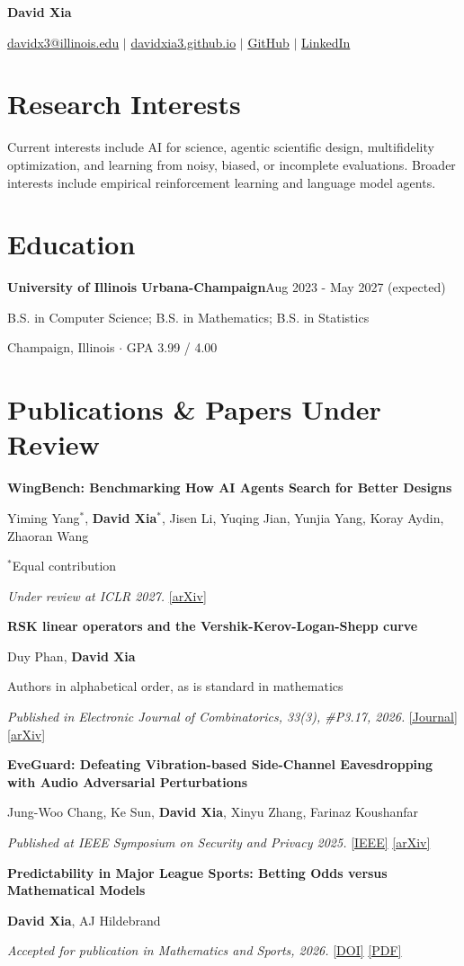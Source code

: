 \documentclass[letterpaper,11pt]{article}
\newcommand{\paper}[4]{\par\addvspace{7pt}\textbf{#1}\par #2\par\textit{#3} #4\par}
\begin{document}
{\centering
{\LARGE\bfseries David Xia}\par\vspace{5pt}
\href{mailto:davidx3@illinois.edu}{davidx3@illinois.edu} $\vert$
\href{https://davidxia3.github.io/}{davidxia3.github.io} $\vert$
\href{https://github.com/davidxia3}{GitHub} $\vert$
\href{https://www.linkedin.com/in/dx3/}{LinkedIn}\par}
\section{Research Interests}
Current interests include AI for science, agentic scientific design, multifidelity optimization, and learning from noisy, biased, or incomplete evaluations. Broader interests include empirical reinforcement learning and language model agents.
\section{Education}
\textbf{University of Illinois Urbana-Champaign}\hfill Aug 2023 - May 2027 (expected)\par
B.S. in Computer Science; B.S. in Mathematics; B.S. in Statistics\par
Champaign, Illinois $\cdot$ GPA 3.99 / 4.00
\section{Publications \& Papers Under Review}
\paper{WingBench: Benchmarking How AI Agents Search for Better Designs}
{Yiming Yang$^*$, \textbf{David Xia}$^*$, Jisen Li, Yuqing Jian, Yunjia Yang, Koray Aydin, Zhaoran Wang\par $^*$Equal contribution}
{Under review at ICLR 2027.}
{\href{https://arxiv.org/abs/2611.28418}{[arXiv]}}
\paper{RSK linear operators and the Vershik-Kerov-Logan-Shepp curve}
{Duy Phan, \textbf{David Xia}\par Authors in alphabetical order, as is standard in mathematics}
{Published in Electronic Journal of Combinatorics, 33(3), \#P3.17, 2026.}
{\href{https://www.combinatorics.org/ojs/index.php/eljc/article/view/v33i3p17}{[Journal]} \href{https://arxiv.org/abs/2504.05510}{[arXiv]}}
\paper{EveGuard: Defeating Vibration-based Side-Channel Eavesdropping with Audio Adversarial Perturbations}
{Jung-Woo Chang, Ke Sun, \textbf{David Xia}, Xinyu Zhang, Farinaz Koushanfar}
{Published at IEEE Symposium on Security and Privacy 2025.}
{\href{https://ieeexplore.ieee.org/document/11023366/}{[IEEE]} \href{https://arxiv.org/abs/2411.10034}{[arXiv]}}
\paper{Predictability in Major League Sports: Betting Odds versus Mathematical Models}
{\textbf{David Xia}, AJ Hildebrand}
{Accepted for publication in Mathematics and Sports, 2026.}
{\href{https://doi.org/10.5149/ms.4631}{[DOI]} \href{https://davidxia3.github.io/docs/predictability_paper.pdf}{[PDF]}}
\end{document}
